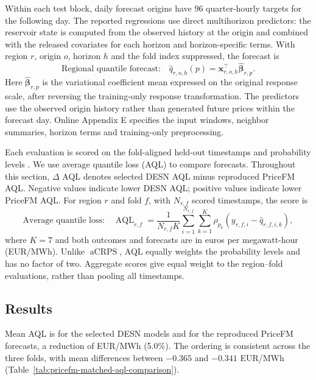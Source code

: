 \documentclass[12pt,letterpaper]{article}
\numberwithin{equation}{section}
\newcommand{\vect}[1]{\bm{#1}}
\newcommand{\aCRPS}{\operatorname{aCRPS}}
\begin{document}
Within each test block, daily forecast origins have 96 quarter-hourly
targets for the following day. The reported regressions
use direct multihorizon predictors: the reservoir state is computed from
the observed history at the origin and combined with the released covariates
for each horizon and horizon-specific terms. With region \(r\), origin
\(o\), horizon \(h\) and the fold index suppressed, the forecast is
\begin{equation}
\text{Regional quantile forecast:}\quad
\widehat q_{r,o,h}(p)
=\vect x_{r,o,h}^{\top}\widehat{\vect\beta}_{r,p}.
\label{eq:pricefm-regional-forecast-main}
\end{equation}
Here \(\widehat{\vect\beta}_{r,p}\) is the variational coefficient mean
expressed on the original response scale, after reversing the training-only
response transformation.
The predictors use the observed origin history rather than generated future
prices within the forecast day. Online Appendix E specifies the input windows,
neighbor summaries, horizon terms and training-only preprocessing.

Each evaluation is scored on the fold-aligned held-out timestamps and
probability levels \PricefmFullPaperQuantiles. We use average quantile loss
(AQL) to compare forecasts. Throughout this section,
\(\Delta\) AQL denotes selected DESN AQL minus reproduced PriceFM AQL.
Negative values indicate lower DESN AQL; positive values indicate lower
PriceFM AQL.
For region \(r\) and fold \(f\), with \(N_{r,f}\) scored timestamps, the score is
\begin{equation}
\text{Average quantile loss:}\quad
\operatorname{AQL}_{r,f}
=\frac{1}{N_{r,f}K}\sum_{i=1}^{N_{r,f}}\sum_{k=1}^{K}
\rho_{p_k}\!\left(y_{r,f,i}-\widehat q_{r,f,i,k}\right),
\label{eq:pricefm-aql-main}
\end{equation}
where \(K=7\) and both outcomes and forecasts are in euros per megawatt-hour
(EUR/MWh).
Unlike \(\aCRPS\), AQL equally weights the probability levels and has no
factor of two. Aggregate scores give equal weight to the \PricefmFullRegionFolds{} region--fold
evaluations, rather than pooling all timestamps.

\subsection{Results}

Mean AQL is \PricefmFullMeanSelectedAql{} for the selected DESN models and
\PricefmFullMeanPricefmAql{} for the reproduced PriceFM forecasts, a reduction
of \PricefmFullMeanReductionAql{} EUR/MWh (5.0\%). The ordering is consistent
across the three folds, with mean differences between \(-0.365\) and
\(-0.341\) EUR/MWh (Table~\ref{tab:pricefm-matched-aql-comparison}).
\end{document}
